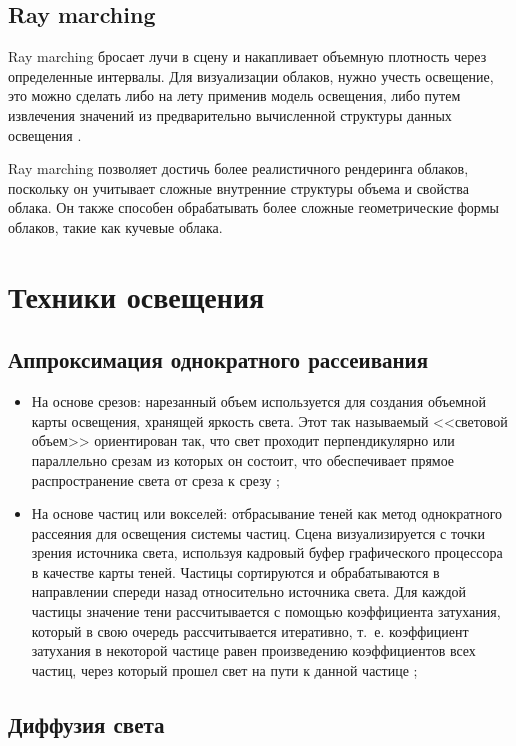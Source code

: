 \subsection{Ray marching}
\label{ray}
Ray marching бросает лучи в сцену и накапливает объемную плотность через определенные интервалы. Для визуализации облаков, нужно учесть освещение, это можно сделать либо на лету применив модель освещения, либо путем извлечения значений из предварительно вычисленной структуры данных освещения \cite{hzd, frostbite, clouds}.

Ray marching позволяет достичь более реалистичного рендеринга облаков, поскольку он учитывает сложные внутренние структуры объема и свойства облака. Он также способен обрабатывать более сложные геометрические формы облаков, такие как кучевые облака.


\section{Техники освещения}

\subsection{Аппроксимация однократного рассеивания}
\begin{itemize}
	\item На основе срезов: нарезанный объем используется для создания объемной карты освещения, хранящей яркость света. Этот так называемый <<световой объем>> ориентирован так, что свет проходит перпендикулярно или параллельно срезам из которых он состоит, что обеспечивает прямое распространение света от среза к срезу \cite{schpok};
	\item На основе частиц или вокселей: отбрасывание теней как метод однократного рассеяния для освещения системы частиц. Сцена визуализируется с точки зрения источника света, используя кадровый буфер графического процессора в качестве карты теней. Частицы сортируются и обрабатываются в направлении спереди назад относительно источника света. Для каждой частицы значение тени рассчитывается с помощью коэффициента затухания, который в свою очередь рассчитывается итеративно, т.~е. коэффициент затухания в некоторой частице равен произведению коэффициентов всех частиц, через который прошел свет на пути к данной частице \cite{voxel};
\end{itemize}

\subsection{Диффузия света}

